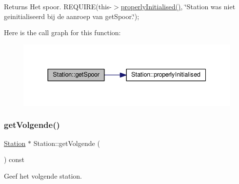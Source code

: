 \begin{DoxyReturn}{Returns}
Het spoor. R\+E\+Q\+U\+I\+RE(this-\/$>$\hyperlink{class_station_a9ce626dd0599e3ea8107404a59c21e16}{properly\+Initialised()}, \char`\"{}\+Station was niet geinitialiseerd bij de aanroep van get\+Spoor.\char`\"{});~\newline

\end{DoxyReturn}
Here is the call graph for this function\+:\nopagebreak
\begin{figure}[H]
\begin{center}
\leavevmode
\includegraphics[width=337pt]{class_station_a5230690094cdfd1e9f443d76f35c8a19_cgraph}
\end{center}
\end{figure}
\mbox{\label{class_station_a330c297adddcbfd5d8871075291e9512}} 
\subsubsection{\texorpdfstring{get\+Volgende()}{getVolgende()}}
{\footnotesize\ttfamily \hyperlink{class_station}{Station} $\ast$ Station\+::get\+Volgende (\begin{DoxyParamCaption}{ }\end{DoxyParamCaption}) const}



Geef het volgende station. 

